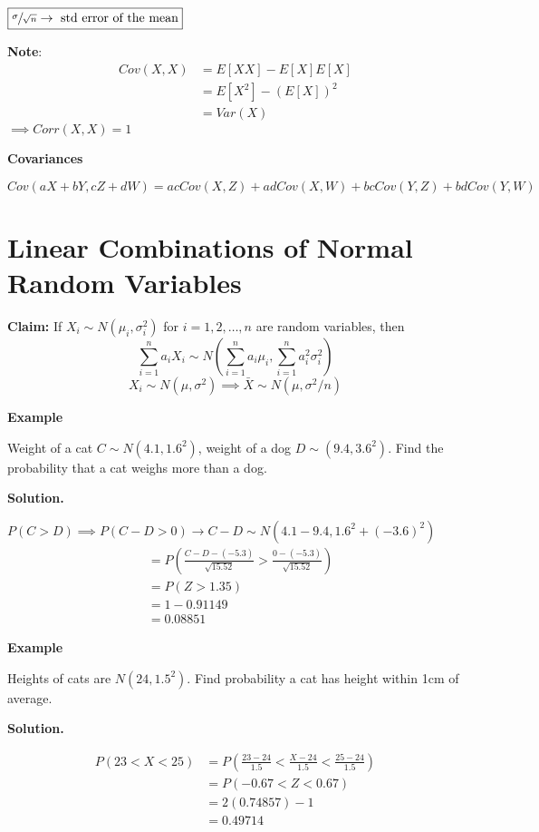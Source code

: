 $\boxed{\sfrac{\sigma}{\sqrt{n}}\rightarrow\text{ std error of the mean}}$

\textbf{Note}:
\begin{align*}
    Cov(X,X)
     & =E[XX]-E[X]E[X]  \\
     & =E[X^2]-(E[X])^2 \\
     & =Var(X)
\end{align*}
$ \implies Corr(X,X)=1 $

\textbf{Covariances}

\[ Cov(aX+bY,cZ+dW)=acCov(X,Z)+adCov(X,W)+bcCov(Y,Z)+bdCov(Y,W) \]

\section{Linear Combinations of Normal Random Variables}
\textbf{Claim:}
If $ X_i \sim N(\mu_i,\sigma_i^2) $ for $ i=1,2,\ldots ,n $
are random variables, then
\[ \sum\limits_{i=1}^{n} a_i X_i \sim
    N\left(\sum\limits_{i=1}^{n}a_i\mu_i,\sum\limits_{i=1}^{n} a_i^2\sigma_i^2\right) \]
\[ \boxed{X_i \sim N(\mu,\sigma^2)\implies\bar{X} \sim N(\mu,\sigma^2/n)} \]

\textbf{Example}

Weight of a cat $ C \sim N(4.1,1.6^2) $, weight of a dog
$ D \sim (9.4,3.6^2) $. Find the probability that a cat weighs more than
a dog.

\textbf{Solution.}

$ P(C>D)\implies P(C-D>0)\rightarrow C-D \sim N(4.1-9.4,1.6^2+(-3.6)^2)$
\begin{align*}
     & =P\left(\frac{C-D-(-5.3)}{\sqrt{15.52}}>\frac{0-(-5.3)}{\sqrt{15.52}}\right) \\
     & =P(Z>1.35)                                                                   \\
     & =1-0.91149                                                                   \\
     & =0.08851
\end{align*}

\textbf{Example}

Heights of cats are $ N(24,1.5^2) $. Find probability a cat has height
within 1cm of average.

\textbf{Solution.}

\begin{align*}
    P(23<X<25) & =
    P\left( \frac{23-24}{1.5}<\frac{X-24}{1.5}<\frac{25-24}{1.5} \right) \\
               & =P(-0.67<Z<0.67)                                        \\
               & =2(0.74857)-1                                           \\
               & =0.49714
\end{align*}

